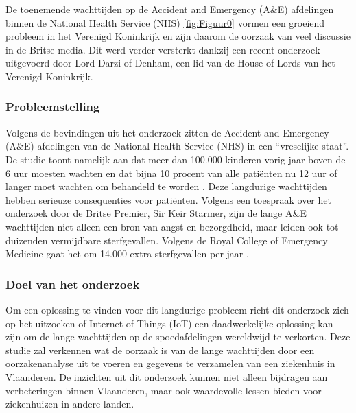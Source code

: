 

De toenemende wachttijden op de Accident and Emergency (A\&E) afdelingen binnen de National Health Service (NHS) \ref{fig:Figuur0} vormen een groeiend probleem in het Verenigd Koninkrijk en zijn daarom de oorzaak van veel discussie in de Britse media. Dit werd verder versterkt dankzij een recent onderzoek uitgevoerd door Lord Darzi of Denham, een lid van de House of Lords van het Verenigd Koninkrijk.

\subsubsection*{Probleemstelling}
Volgens de bevindingen uit het onderzoek zitten de Accident and Emergency (A\&E) afdelingen van de National Health Service (NHS) in een “vreselijke staat”. De studie toont namelijk aan dat meer dan 100.000 kinderen vorig jaar boven de 6 uur moesten wachten en dat bijna 10 procent van alle patiënten nu 12 uur of langer moet wachten om behandeld te worden \autocite{LordDarzi2024}. Deze langdurige wachttijden hebben serieuze consequenties voor patiënten. Volgens een toespraak over het onderzoek door de Britse Premier, Sir Keir Starmer, zijn de lange A\&E wachttijden niet alleen een bron van angst en bezorgdheid, maar leiden ook tot duizenden vermijdbare sterfgevallen. Volgens de Royal College of Emergency Medicine gaat het om 14.000 extra sterfgevallen per jaar \autocite{Starmer2024}.


\subsubsection*{Doel van het onderzoek}
Om een oplossing te vinden voor dit langdurige probleem richt dit onderzoek zich op het uitzoeken of Internet of Things (IoT) een daadwerkelijke oplossing kan zijn om de lange wachttijden op de spoedafdelingen wereldwijd te verkorten. Deze studie zal verkennen wat de oorzaak is van de lange wachttijden door een oorzakenanalyse uit te voeren en gegevens te verzamelen van een ziekenhuis in Vlaanderen. De inzichten uit dit onderzoek kunnen niet alleen bijdragen aan verbeteringen binnen Vlaanderen, maar ook waardevolle lessen bieden voor ziekenhuizen in andere landen.


